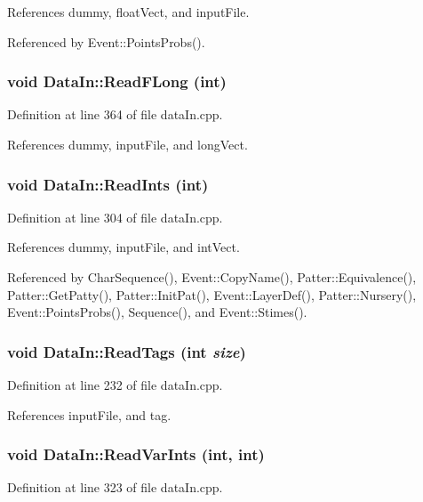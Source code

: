 References dummy, float\-Vect, and input\-File.

Referenced by Event::Points\-Probs().
\subsubsection{\setlength{\rightskip}{0pt plus 5cm}void Data\-In::Read\-FLong (int)}\label{classDataIn_a14}




Definition at line 364 of file data\-In.cpp.

References dummy, input\-File, and long\-Vect.
\subsubsection{\setlength{\rightskip}{0pt plus 5cm}void Data\-In::Read\-Ints (int)}\label{classDataIn_a11}




Definition at line 304 of file data\-In.cpp.

References dummy, input\-File, and int\-Vect.

Referenced by Char\-Sequence(), Event::Copy\-Name(), Patter::Equivalence(), Patter::Get\-Patty(), Patter::Init\-Pat(), Event::Layer\-Def(), Patter::Nursery(), Event::Points\-Probs(), Sequence(), and Event::Stimes().
\subsubsection{\setlength{\rightskip}{0pt plus 5cm}void Data\-In::Read\-Tags (int {\em size})}\label{classDataIn_a5}




Definition at line 232 of file data\-In.cpp.

References input\-File, and tag.
\subsubsection{\setlength{\rightskip}{0pt plus 5cm}void Data\-In::Read\-Var\-Ints (int, int)}\label{classDataIn_a12}




Definition at line 323 of file data\-In.cpp.

